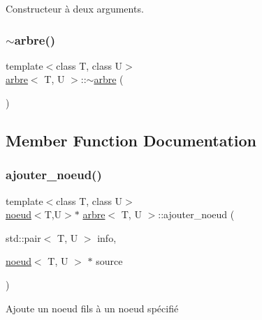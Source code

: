 Constructeur à deux arguments. 

\mbox{\label{classarbre_a42c3498c69b99f10b40824295ff30c9f}} 
\subsubsection{\texorpdfstring{$\sim$arbre()}{~arbre()}}
{\footnotesize\ttfamily template$<$class T, class U$>$ \\
\hyperlink{classarbre}{arbre}$<$ T, U $>$\+::$\sim$\hyperlink{classarbre}{arbre} (\begin{DoxyParamCaption}{ }\end{DoxyParamCaption})\hspace{0.3cm}{\ttfamily [inline]}}



\subsection{Member Function Documentation}
\mbox{\label{classarbre_aa0a822cdc25b6c5b43eb8ed2afc79799}} 
\subsubsection{\texorpdfstring{ajouter\+\_\+noeud()}{ajouter\_noeud()}}
{\footnotesize\ttfamily template$<$class T, class U$>$ \\
\hyperlink{classnoeud}{noeud}$<$T,U$>$$\ast$ \hyperlink{classarbre}{arbre}$<$ T, U $>$\+::ajouter\+\_\+noeud (\begin{DoxyParamCaption}\item[{std\+::pair$<$ T, U $>$}]{info,  }\item[{\hyperlink{classnoeud}{noeud}$<$ T, U $>$ $\ast$}]{source }\end{DoxyParamCaption})\hspace{0.3cm}{\ttfamily [inline]}}



Ajoute un noeud fils à un noeud spécifié 

\mbox{\label{classarbre_a41217bef9d41016b33fac301b6e5d65d}} 
